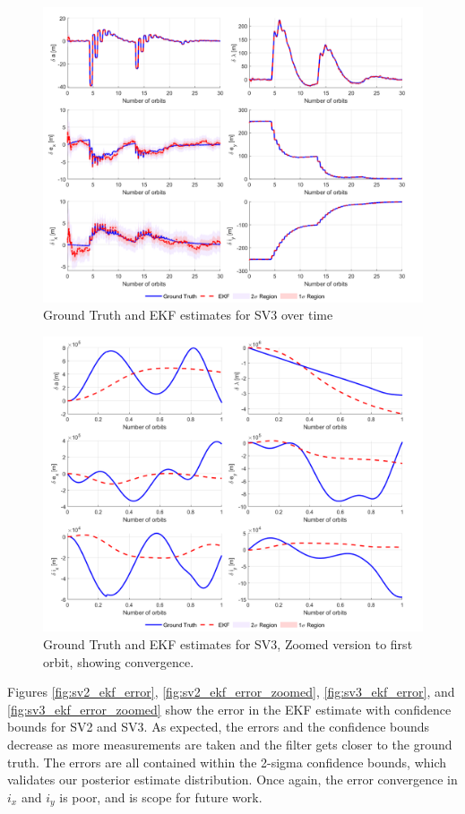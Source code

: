 \begin{figure}[H]
    \centering
    \includegraphics[width=0.7\linewidth]{sim/figures/PS8/ROE_over_time_SV3_comparison.png}
    \caption{Ground Truth and EKF estimates for SV3 over time}
    \label{fig:sv3_ekf_estimates}
\end{figure}

\begin{figure}[H]
    \centering
    \includegraphics[width=0.7\linewidth]{sim/figures/PS8/ROE_over_time_SV3_comparison_zoomed.png}
    \caption{Ground Truth and EKF estimates for SV3, Zoomed version to first orbit, showing convergence.}
    \label{fig:sv3_ekf_estimates_zoom}
\end{figure}

Figures \ref{fig:sv2_ekf_error}, \ref{fig:sv2_ekf_error_zoomed}, \ref{fig:sv3_ekf_error}, and \ref{fig:sv3_ekf_error_zoomed} show the error in the EKF estimate with confidence bounds for SV2 and SV3. As expected, the errors and the confidence bounds decrease as more measurements are taken and the filter gets closer to the ground truth. The errors are all contained within the 2-sigma confidence bounds, which validates our posterior estimate distribution. Once again, the error convergence in $i_x$ and $i_y$ is poor, and is scope for future work.

